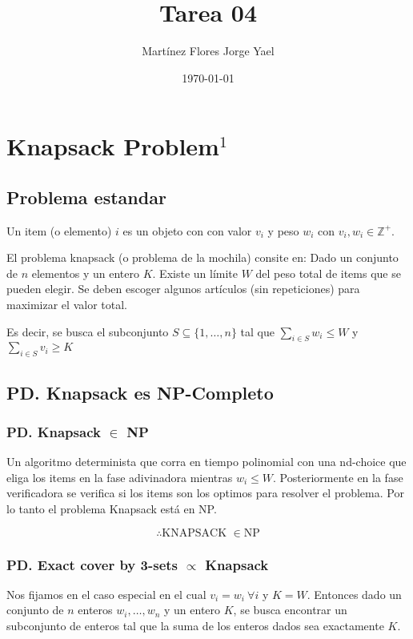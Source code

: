 \documentclass[letterpaper,12pt]{article}
\begin{document}
\title{Tarea 04}
\author{Martínez Flores Jorge Yael}
\date{\today}
\maketitle

\section{Knapsack Problem$^{1}$}
\subsection{Problema estandar}

Un item (o elemento) $i$ es un objeto con con valor $v_i$ y peso $w_i$ con $v_i, 
w_i \in \mathds{Z}^+$.

El problema knapsack (o problema de la mochila) consite en: Dado un conjunto
de $n$ elementos y un entero $K$.  Existe un límite $W$ del peso total de 
items que se pueden elegir. Se deben escoger algunos artículos 
(sin repeticiones) para maximizar el valor total.

Es decir, se busca el subconjunto 
$S \subseteq \{ 1, \dots , n \}$ tal que $\sum_{i \in S} w_i \le W$ y $\sum_{i \in S} 
v_i \ge K$

\subsection{PD. Knapsack es NP-Completo}

\subsubsection{PD. Knapsack $\in$ NP}

Un algoritmo determinista que corra en tiempo polinomial con una nd-choice que eliga
los items en la fase adivinadora mientras $w_i \le  W$. Posteriormente en la fase
verificadora se verifica si los items son los optimos para resolver el problema. Por 
lo tanto el problema Knapsack está en NP.

$$ \therefore \text{KNAPSACK } \in \text{NP} $$

\subsubsection{PD. Exact cover by 3-sets $\varpropto$ Knapsack}

Nos fijamos en el caso especial en el cual $v_i = w_i \ \forall i$ y $K = W$.
Entonces dado un conjunto de $n$ enteros $w_i, \dots, w_n$ y un entero $K$, 
se busca encontrar un subconjunto de enteros tal que la suma de los enteros dados 
sea exactamente $K$.
\end{document}
